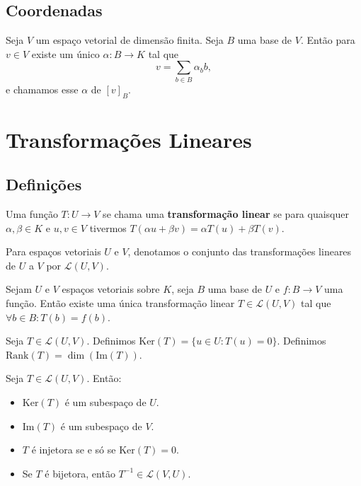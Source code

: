 \documentclass[11pt,twoside,a4paper]{book}
\begin{document}
\section{Coordenadas}

\begin{definicao}
Seja $V$ um espaço vetorial de dimensão finita. Seja $B$ uma base de $V$. Então para $v\in V$ existe um único $\alpha:B\rightarrow K$ tal que \[v=\sum\limits_{b\in B}\alpha_bb,\] e chamamos esse $\alpha$ de $[v]_B$.
\end{definicao}

\chapter{Transformações Lineares}

\section{Definições}

\begin{definicao}
Uma função $T:U\rightarrow V$ se chama uma \textbf{transformação linear} se para quaisquer $\alpha,\beta\in K$ e $u,v\in V$ tivermos $T(\alpha u+\beta v)=\alpha T(u)+\beta T(v)$.
\end{definicao}

\begin{definicao}
Para espaços vetoriais $U$ e $V$, denotamos o conjunto das transformações lineares de $U$ a $V$ por $\mathcal{L}(U,V).$
\end{definicao}

\begin{teorema}
Sejam $U$ e $V$ espaços vetoriais sobre $K$, seja $B$ uma base de $U$ e $f:B\rightarrow V$ uma função. Então existe uma única transformação linear $T\in\mathcal{L}(U,V)$ tal que $\forall b\in B:T(b)=f(b)$.
\end{teorema}

\begin{definicao}
Seja $T\in\mathcal{L}(U,V)$. Definimos $\mathrm{Ker}(T)=\{u\in U:T(u)=0\}$. Definimos $\mathrm{Rank}(T)=\dim(\mathrm{Im}(T))$.
\end{definicao}

\begin{proposicao}
Seja $T\in\mathcal{L}(U,V)$. Então:
\begin{itemize}
\item $\mathrm{Ker}(T)$ é um subespaço de $U$.
\item $\mathrm{Im}(T)$ é um subespaço de $V$.
\item $T$ é injetora se e só se $\mathrm{Ker}(T)=0$.
\item Se $T$ é bijetora, então $T^{-1}\in\mathcal{L}(V,U)$.
\end{itemize}
\end{proposicao}
\end{document}
